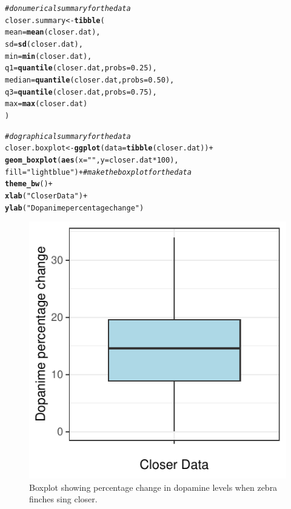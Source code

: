 \documentclass{article}\usepackage[]{graphicx}\usepackage[]{xcolor}
\makeatletter
\def\maxwidth{ %
  \ifdim\Gin@nat@width>\linewidth
    \linewidth
  \else
    \Gin@nat@width
  \fi
}
\newcommand{\hlnum}[1]{\textcolor[rgb]{0.686,0.059,0.569}{#1}}%
\newcommand{\hlsng}[1]{\textcolor[rgb]{0.192,0.494,0.8}{#1}}%
\newcommand{\hlcom}[1]{\textcolor[rgb]{0.678,0.584,0.686}{\textit{#1}}}%
\newcommand{\hlopt}[1]{\textcolor[rgb]{0,0,0}{#1}}%
\newcommand{\hldef}[1]{\textcolor[rgb]{0.345,0.345,0.345}{#1}}%
\newcommand{\hlkwb}[1]{\textcolor[rgb]{0.69,0.353,0.396}{#1}}%
\newcommand{\hlkwc}[1]{\textcolor[rgb]{0.333,0.667,0.333}{#1}}%
\newcommand{\hlkwd}[1]{\textcolor[rgb]{0.737,0.353,0.396}{\textbf{#1}}}%
\newenvironment{kframe}{%
 \def\at@end@of@kframe{}%
 \ifinner\ifhmode%
  \def\at@end@of@kframe{\end{minipage}}%
  \begin{minipage}{\columnwidth}%
 \fi\fi%
 \def\FrameCommand##1{\hskip\@totalleftmargin \hskip-\fboxsep
 \colorbox{shadecolor}{##1}\hskip-\fboxsep
     \hskip-\linewidth \hskip-\@totalleftmargin \hskip\columnwidth}%
 \MakeFramed {\advance\hsize-\width
   \@totalleftmargin\z@ \linewidth\hsize
   \@setminipage}}%
 {\par\unskip\endMakeFramed%
 \at@end@of@kframe}
\newenvironment{knitrout}{}{} %
\makeatother
\begin{document}
\begin{enumerate}
\begin{enumerate}
\begin{knitrout}
\begin{kframe}
\begin{alltt}
\hlcom{#do numerical summary for the data}
\hldef{closer.summary} \hlkwb{<-} \hlkwd{tibble}\hldef{(}
  \hlkwc{mean} \hldef{=} \hlkwd{mean}\hldef{(closer.dat),}
  \hlkwc{sd} \hldef{=} \hlkwd{sd}\hldef{(closer.dat),}
  \hlkwc{min} \hldef{=} \hlkwd{min}\hldef{(closer.dat),}
  \hlkwc{q1} \hldef{=} \hlkwd{quantile}\hldef{(closer.dat,} \hlkwc{probs} \hldef{=} \hlnum{0.25}\hldef{),}
  \hlkwc{median} \hldef{=} \hlkwd{quantile}\hldef{(closer.dat,} \hlkwc{probs} \hldef{=} \hlnum{0.50}\hldef{),}
  \hlkwc{q3} \hldef{=} \hlkwd{quantile}\hldef{(closer.dat,} \hlkwc{probs} \hldef{=} \hlnum{0.75}\hldef{),}
  \hlkwc{max} \hldef{=} \hlkwd{max}\hldef{(closer.dat)}
\hldef{)}

\hlcom{#do graphical summary for the data}
\hldef{closer.boxplot} \hlkwb{<-} \hlkwd{ggplot}\hldef{(}\hlkwc{data} \hldef{=} \hlkwd{tibble}\hldef{(closer.dat))}\hlopt{+}
  \hlkwd{geom_boxplot}\hldef{(}\hlkwd{aes}\hldef{(}\hlkwc{x} \hldef{=} \hlsng{""}\hldef{,} \hlkwc{y} \hldef{= closer.dat}\hlopt{*}\hlnum{100}\hldef{),}
            \hlkwc{fill} \hldef{=} \hlsng{"lightblue"}\hldef{)}\hlopt{+} \hlcom{#make the boxplot for the data}
  \hlkwd{theme_bw}\hldef{()}\hlopt{+}
  \hlkwd{xlab}\hldef{(}\hlsng{"Closer Data"}\hldef{)}\hlopt{+}
  \hlkwd{ylab}\hldef{(}\hlsng{"Dopanime percentage change"}\hldef{)}
\end{alltt}
\end{kframe}
\end{knitrout}

\begin{figure}[H]
\centering
\begin{knitrout}
\color{fgcolor}
\includegraphics[width=\maxwidth]{figure/unnamed-chunk-8-1} 
\end{knitrout}
\caption{Boxplot showing percentage change in dopamine levels when zebra finches sing closer.}
\end{figure}
\begin{table}


\end{table}
\end{enumerate}
\end{enumerate}
\end{document}

